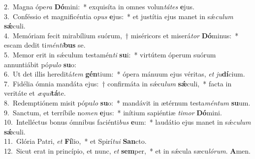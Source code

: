 {2.~}Magna ópe\textit{ra} \textbf{Dó}mini:~* exquisíta in omnes volun\textit{tá}\textit{tes} \textbf{e}jus.\\
{3.~}Conféssio et magnificéntia o\textit{pus} \textbf{e}jus:~* et justítia ejus manet in sǽ\textit{cu}\textit{lum} \textbf{sǽ}culi.\\
{4.~}Memóriam fecit mirabílium suórum,~† miséricors et miserá\textit{tor} \textbf{Dó}minus:~* escam dedit ti\textit{mén}\textit{ti}\textbf{bus} se.\\
{5.~}Memor erit in sǽculum testamén\textit{ti} \textbf{su}i:~* virtútem óperum suórum annuntiábit pó\textit{pu}\textit{lo} \textbf{su}o:\\
{6.~}Ut det illis hereditá\textit{tem} \textbf{gén}tium:~* ópera mánuum ejus véritas, \textit{et} \textit{ju}\textbf{dí}cium.\\
{7.~}Fidélia ómnia mandáta ejus:~† confirmáta in sǽcu\textit{lum} \textbf{sǽ}culi,~* facta in veritáte et \textit{æ}\textit{qui}\textbf{tá}te.\\
{8.~}Redemptiónem misit pópu\textit{lo} \textbf{su}o:~* mandávit in ætérnum testa\textit{mén}\textit{tum} \textbf{su}um.\\
{9.~}Sanctum, et terríbile no\textit{men} \textbf{e}jus:~* inítium sapiéntiæ \textit{ti}\textit{mor} \textbf{Dó}mini.\\
{10.~}Intelléctus bonus ómnibus faciénti\textit{bus} \textbf{e}um:~* laudátio ejus manet in sǽ\textit{cu}\textit{lum} \textbf{sǽ}culi.\\
{11.~}Glória Patri, \textit{et} \textbf{Fí}lio,~* et Spirí\textit{tu}\textit{i} \textbf{San}cto.\\
{12.~}Sicut erat in princípio, et nunc, \textit{et} \textbf{sem}per,~* et in sǽcula sæcu\textit{ló}\textit{rum}. \textbf{A}men.\\
